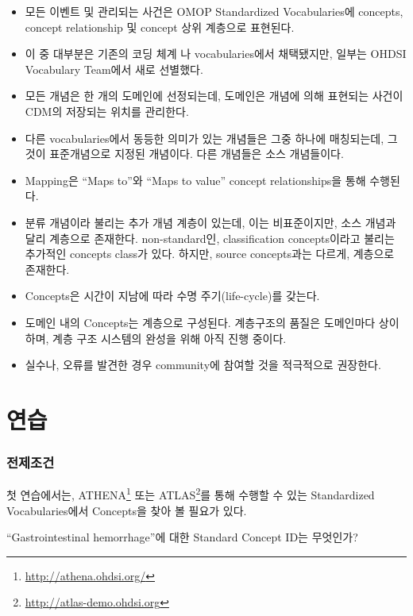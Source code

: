 \documentclass[11pt]{book}
\providecommand{\tightlist}{%
  \setlength{\itemsep}{0pt}\setlength{\parskip}{0pt}}
\let\rmarkdownfootnote\footnote%
\def\footnote{\protect\rmarkdownfootnote}
\theoremstyle{definition}
\theoremstyle{definition}
\theoremstyle{definition}
\theoremstyle{remark}
\let\BeginKnitrBlock\begin \let\EndKnitrBlock\end
\begin{document}
\BeginKnitrBlock{rmdsummary}
\begin{itemize}
\tightlist
\item
  모든 이벤트 및 관리되는 사건은 OMOP Standardized Vocabularies에
  concepts, concept relationship 및 concept 상위 계층으로 표현된다.
\item
  이 중 대부분은 기존의 코딩 체계 나 vocabularies에서 채택됐지만, 일부는
  OHDSI Vocabulary Team에서 새로 선별했다.
\item
  모든 개념은 한 개의 도메인에 선정되는데, 도메인은 개념에 의해 표현되는
  사건이 CDM의 저장되는 위치를 관리한다.
\item
  다른 vocabularies에서 동등한 의미가 있는 개념들은 그중 하나에
  매칭되는데, 그것이 표준개념으로 지정된 개념이다. 다른 개념들은 소스
  개념들이다.
\item
  Mapping은 ``Maps to''와 ``Maps to value'' concept relationships을 통해
  수행된다.
\item
  분류 개념이라 불리는 추가 개념 계층이 있는데, 이는 비표준이지만, 소스
  개념과 달리 계층으로 존재한다. non-standard인, classification
  concepts이라고 불리는 추가적인 concepts class가 있다. 하지만, source
  concepts과는 다르게, 계층으로 존재한다.
\item
  Concepts은 시간이 지남에 따라 수명 주기(life-cycle)를 갖는다.
\item
  도메인 내의 Concepts는 계층으로 구성된다. 계층구조의 품질은 도메인마다
  상이하며, 계층 구조 시스템의 완성을 위해 아직 진행 중이다.
\item
  실수나, 오류를 발견한 경우 community에 참여할 것을 적극적으로
  권장한다.
\end{itemize}
\EndKnitrBlock{rmdsummary}

\section{연습}

\subsubsection*{전제조건}

첫 연습에서는, ATHENA\footnote{\url{http://athena.ohdsi.org/}} 또는
ATLAS\footnote{\url{http://atlas-demo.ohdsi.org}}를 통해 수행할 수 있는
Standardized Vocabularies에서 Concepts을 찾아 볼 필요가 있다.

\BeginKnitrBlock{exercise}
\protect\hypertarget{exr:exerciseVocab1}{}{\label{exr:exerciseVocab1}
}``Gastrointestinal hemorrhage''에 대한 Standard Concept ID는 무엇인가?
\EndKnitrBlock{exercise}
\end{document}
